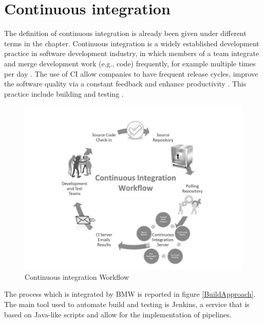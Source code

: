 \documentclass[../main.tex]{subfiles}
\begin{document}
\section{Continuous integration}
The definition of continuous integration is already been given under different terms in the chapter. Continuous integration is a widely established development practice in software development industry, in which members of a team integrate and merge development work (e.g., code) frequently, for example multiple times per day \cite{fitzgerald2017continuous}. The use of CI allow companies to have frequent release cycles, improve the software quality via a constant feedback and enhance productivity \cite{fitzgerald2017continuous}. This practice include building and testing \cite{7057604}.
\begin{figure}[h]
    \centering
    \includegraphics[width=0.8\linewidth]{images_folder/CI.jpg}
    \caption{Continuous integration Workflow}
    \label{fig:Continous Integration}
\end{figure}
The process which is integrated by BMW is reported in figure \ref{BuildApproach}. The main tool used to automate build and testing is Jenkins, a service that is based on Java-like scripts and allow for the implementation of pipelines. 
\cleardoublepage
\end{document}
